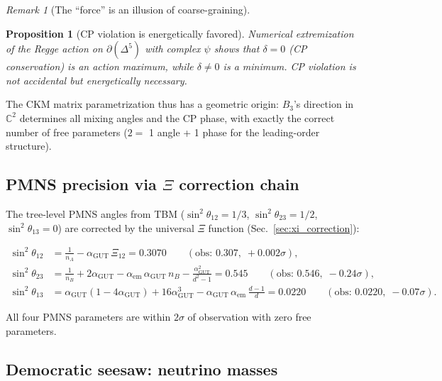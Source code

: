 \documentclass[12pt]{article}
\newtheorem{proposition}[theorem]{Proposition}
\theoremstyle{remark}
\newtheorem{remark}[theorem]{Remark}
\theoremstyle{definition}
\newcommand{\CC}{\mathbb{C}}
\newcommand{\agut}{\alpha_{\mathrm{GUT}}}
\begin{document}
\begin{remark}[The ``force'' is an illusion of coarse-graining]
\begin{proposition}[CP violation is energetically favored]
\label{prop:cp}
Numerical extremization of the Regge action on $\partial(\Delta^5)$ with complex $\psi$ shows that $\delta = 0$ (CP conservation) is an action \emph{maximum}, while $\delta \neq 0$ is a \emph{minimum}.  CP violation is not accidental but energetically necessary.
\end{proposition}

The CKM matrix parametrization thus has a geometric origin: $B_3$'s direction in $\CC^2$ determines all mixing angles and the CP phase, with exactly the correct number of free parameters ($2 = $ 1 angle + 1 phase for the leading-order structure).

\subsection{PMNS precision via $\Xi$ correction chain}
\label{sec:pmns_xi}

The tree-level PMNS angles from TBM ($\sin^2\theta_{12} = 1/3$, $\sin^2\theta_{23} = 1/2$, $\sin^2\theta_{13} = 0$) are corrected by the universal $\Xi$ function (Sec.~\ref{sec:xi_correction}):

\begin{align}
\sin^2\theta_{12} &= \frac{1}{n_A} - \agut\,\Xi_{12} = 0.3070 \qquad(\text{obs: } 0.307,\; +0.002\sigma), \\
\sin^2\theta_{23} &= \frac{1}{n_B} + 2\agut - \alpha_\mathrm{em}\,\agut\,n_B - \frac{\agut^2}{d^2-1} = 0.545 \qquad(\text{obs: } 0.546,\; -0.24\sigma), \\
\sin^2\theta_{13} &= \agut(1 - 4\agut) + 16\agut^3 - \agut\,\alpha_\mathrm{em}\,\frac{d-1}{d} = 0.0220 \qquad(\text{obs: } 0.0220,\; -0.07\sigma).
\end{align}

All four PMNS parameters are within $2\sigma$ of observation with zero free parameters.

\subsection{Democratic seesaw: neutrino masses}
\label{sec:democratic_seesaw}


\end{remark}
\end{document}

